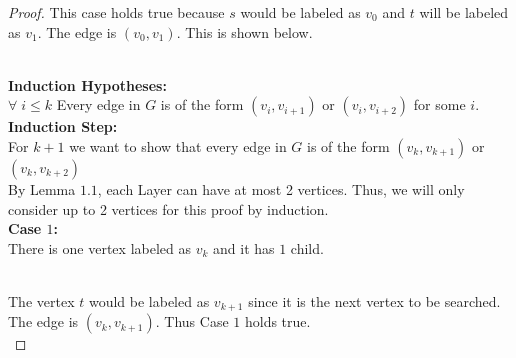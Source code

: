 \documentclass{article}
\theoremstyle{definition}
\theoremstyle{remark}
\theoremstyle{plain}
\begin{document}
\begin{proof}

This case holds true because $s$ would be labeled as $v_0$ and $t$ will be labeled as $v_1$. The edge is $(v_0, v_1)$. This is shown below.\\

\\

\textbf{Induction Hypotheses:}\\ 
$\forall\;i\leq k $ Every edge in $G$ is of the form $(v_i, v_{i+1})$ or $(v_i, v_{i+2})$ for some $i$.\\

\textbf{Induction Step:}\\
For $k+1$ we want to show that every edge in $G$ is of the form $(v_k, v_{k+1})$ or $(v_k, v_{k+2})$\\

By Lemma $1.1$, each Layer can have at most 2 vertices. Thus, we will only consider up to 2 vertices for this proof by induction.\\

\textbf{Case $1$:}\\
There is one vertex labeled as $v_k$ and it has $1$ child.\\

\\

The vertex $t$ would be labeled as $v_{k+1}$ since it is the next vertex to be searched. The edge is $(v_k, v_{k+1})$. Thus Case $1$ holds true.\\

\end{proof}
\end{document}
